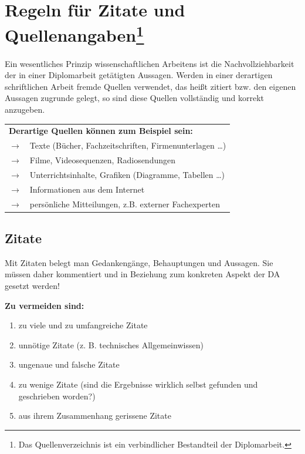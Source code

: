 \documentclass[a4paper, 12pt, xcolor=dvipsnames]{scrartcl}		%
\begin{document}
\section{Regeln für Zitate und Quellenangaben\protect\footnote{Das Quellenverzeichnis ist ein verbindlicher Bestandteil der Diplomarbeit.}}
Ein wesentliches Prinzip wissenschaftlichen Arbeitens ist die Nachvollziehbarkeit der in einer Diplomarbeit
getätigten Aussagen. Werden in einer derartigen schriftlichen Arbeit fremde Quellen verwendet, das heißt zitiert bzw. den eigenen Aussagen zugrunde gelegt, so sind diese Quellen vollständig und korrekt anzugeben.\\

{\begin{tabular}{p{1.0cm}p{12.0cm}}
\multicolumn{2}{p{13.0cm}}{\textbf{Derartige Quellen können zum Beispiel sein:}} \\ 
\textcolor{black!80} {\large\textbf{$\to$}}  & Texte (Bücher, Fachzeitschriften, Firmenunterlagen \dots) \\ 
\textcolor{black!80} {\large\textbf{$\to$}}  & Filme, Videosequenzen, Radiosendungen \\
\textcolor{black!80} {\large\textbf{$\to$}}  & Unterrichtsinhalte, Grafiken (Diagramme, Tabellen \dots) \\
\textcolor{black!80} {\large\textbf{$\to$}}  & Informationen aus dem Internet \\
\textcolor{black!80} {\large\textbf{$\to$}}  & persönliche Mitteilungen, z.B. externer Fachexperten \\ 
\end{tabular}}
\vspace{0.5cm}
 

\subsection{Zitate}

%
\begin{Merksatz}
Mit Zitaten belegt man Gedankengänge, Behauptungen und Aussagen.
Sie müssen daher kommentiert und in Beziehung zum konkreten Aspekt der DA gesetzt
werden!
\end{Merksatz}
%

\textbf{Zu vermeiden sind:}
%
\begin{enumerate}
\linespread {1.0}%
\item zu viele und zu umfangreiche Zitate
\item unnötige Zitate (z. B. technisches Allgemeinwissen)
\item ungenaue und falsche Zitate
\item zu wenige Zitate (sind die Ergebnisse wirklich selbst gefunden und geschrieben worden?)
\item aus ihrem Zusammenhang gerissene Zitate
\linespread {1.25}%
\end{enumerate}
\end{document}
